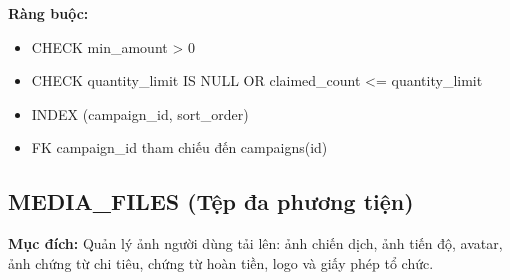 \textbf{Ràng buộc:}
\begin{itemize}
    \item CHECK min\_\allowbreak{}amount \textgreater{} 0
    \item CHECK quantity\_\allowbreak{}limit IS NULL OR claimed\_\allowbreak{}count \textless{}= quantity\_\allowbreak{}limit
    \item INDEX (campaign\_\allowbreak{}id, sort\_\allowbreak{}order)
    \item FK campaign\_\allowbreak{}id tham chiếu đến campaigns(id)
\end{itemize}

\subsection{MEDIA\_\allowbreak{}FILES (Tệp đa phương tiện)}

\textbf{Mục đích:} Quản lý ảnh người dùng tải lên: ảnh chiến dịch, ảnh tiến độ, avatar, ảnh chứng từ chi tiêu, chứng từ hoàn tiền, logo và giấy phép tổ chức.

